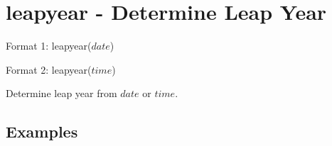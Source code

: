 
%

\section{leapyear - Determine Leap Year\label{sect:leapyear}}

Format 1: leapyear($date$)

Format 2: leapyear($time$)

Determine leap year from $date$ or $time$.


\subsection*{Examples}


%

